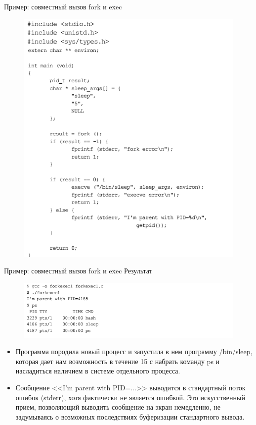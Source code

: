 \documentclass{beamer}
\begin{document}
\begin{frame}{Пример: совместный вызов fork и exec}
\begin{figure}[h]
\centering
\includegraphics[scale=0.5]{images/lec07-pic40.png}
\end{figure}
\end{frame}

\begin{frame}{Пример: совместный вызов fork и exec}
Результат
\begin{figure}[h]
\centering
\includegraphics[scale=0.5]{images/lec07-pic41.png}
\end{figure}
\begin{itemize}
\item Программа породила новый процесс и запустила в нем программу
/bin/sleep, которая дает нам возможность в течение 15 с набрать команду ps и насладиться наличием в системе отдельного процесса.
\item Сообщение <<I'm parent with PID=...>> выводится в стандартный поток ошибок
(stderr), хотя фактически не является ошибкой. Это искусственный прием, позволяющий выводить сообщение на экран немедленно, не задумываясь о возможных
последствиях буферизации стандартного вывода.
\end{itemize}
\end{frame}
\end{document}
